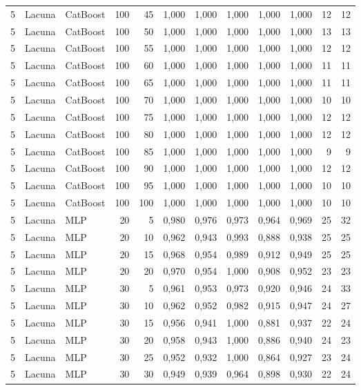 \begin{longtable}{@{}rllrrrrrrrrr@{}}
5 & Lacuna & CatBoost & 100 & 45 & 1,000 & 1,000 & 1,000 & 1,000 & 1,000 & 12 & 12 \\
5 & Lacuna & CatBoost & 100 & 50 & 1,000 & 1,000 & 1,000 & 1,000 & 1,000 & 13 & 13 \\
5 & Lacuna & CatBoost & 100 & 55 & 1,000 & 1,000 & 1,000 & 1,000 & 1,000 & 12 & 12 \\
5 & Lacuna & CatBoost & 100 & 60 & 1,000 & 1,000 & 1,000 & 1,000 & 1,000 & 11 & 11 \\
5 & Lacuna & CatBoost & 100 & 65 & 1,000 & 1,000 & 1,000 & 1,000 & 1,000 & 11 & 11 \\
5 & Lacuna & CatBoost & 100 & 70 & 1,000 & 1,000 & 1,000 & 1,000 & 1,000 & 10 & 10 \\
5 & Lacuna & CatBoost & 100 & 75 & 1,000 & 1,000 & 1,000 & 1,000 & 1,000 & 12 & 12 \\
5 & Lacuna & CatBoost & 100 & 80 & 1,000 & 1,000 & 1,000 & 1,000 & 1,000 & 12 & 12 \\
5 & Lacuna & CatBoost & 100 & 85 & 1,000 & 1,000 & 1,000 & 1,000 & 1,000 & 9 & 9 \\
5 & Lacuna & CatBoost & 100 & 90 & 1,000 & 1,000 & 1,000 & 1,000 & 1,000 & 12 & 12 \\
5 & Lacuna & CatBoost & 100 & 95 & 1,000 & 1,000 & 1,000 & 1,000 & 1,000 & 10 & 10 \\
5 & Lacuna & CatBoost & 100 & 100 & 1,000 & 1,000 & 1,000 & 1,000 & 1,000 & 10 & 10 \\
5 & Lacuna & MLP & 20 & 5 & 0,980 & 0,976 & 0,973 & 0,964 & 0,969 & 25 & 32 \\
5 & Lacuna & MLP & 20 & 10 & 0,962 & 0,943 & 0,993 & 0,888 & 0,938 & 25 & 25 \\
5 & Lacuna & MLP & 20 & 15 & 0,968 & 0,954 & 0,989 & 0,912 & 0,949 & 25 & 25 \\
5 & Lacuna & MLP & 20 & 20 & 0,970 & 0,954 & 1,000 & 0,908 & 0,952 & 23 & 23 \\
5 & Lacuna & MLP & 30 & 5 & 0,961 & 0,953 & 0,973 & 0,920 & 0,946 & 24 & 33 \\
5 & Lacuna & MLP & 30 & 10 & 0,962 & 0,952 & 0,982 & 0,915 & 0,947 & 24 & 27 \\
5 & Lacuna & MLP & 30 & 15 & 0,956 & 0,941 & 1,000 & 0,881 & 0,937 & 22 & 24 \\
5 & Lacuna & MLP & 30 & 20 & 0,958 & 0,943 & 1,000 & 0,886 & 0,940 & 24 & 23 \\
5 & Lacuna & MLP & 30 & 25 & 0,952 & 0,932 & 1,000 & 0,864 & 0,927 & 23 & 24 \\
5 & Lacuna & MLP & 30 & 30 & 0,949 & 0,939 & 0,964 & 0,898 & 0,930 & 22 & 24 \\

\end{longtable}
